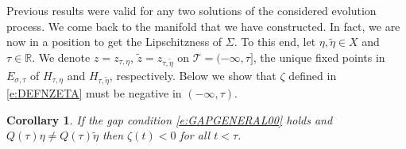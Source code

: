 \documentclass[a4paper,11pt,reqno]{amsart}
\theoremstyle{plain}
\newtheorem{cor}[lem]{Corollary}
\theoremstyle{definition}
\numberwithin{equation}{section}
\newcommand{\R}{\mathbb{R}}
\newcommand{\calt}{\mathcal T}
\begin{document}
Previous results were valid for any two solutions of the considered evolution process. We come back to the manifold that we have constructed. In fact, we are now in a position to get the Lipschitzness of $\Sigma$. To this end, let $\eta,\tilde\eta\in X$ and $\tau\in\R$. We denote $z=z_{\tau,\eta}$, $\tilde{z}=z_{\tau,\tilde\eta}$ on $\calt=(-\infty,\tau]$, the unique fixed points in $E_{\sigma,\tau}$ of $H_{\tau,\eta}$ and $H_{\tau,\tilde\eta}$, respectively. Below we show that $\zeta$ defined in \eqref{e:DEFNZETA} must be negative in $(-\infty,\tau)$.

\begin{cor}\label{cor:ALWAYSNEGATIVE}
If the gap condition \eqref{e:GAPGENERAL00} holds and $Q(\tau)\eta\neq Q(\tau)\tilde\eta$ then 
$\zeta(t)<0$ for all $t<\tau$.
\end{cor}
\end{document}
